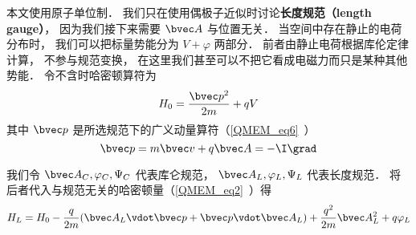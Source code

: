 
\begin{issues}
\issueTODO
\end{issues}


本文使用原子单位制． 我们只在使用偶极子近似时讨论\textbf{长度规范（length gauge）}， 因为我们接下来需要 $\bvec A$ 与位置无关． 当空间中存在静止的电荷分布时， 我们可以把标量势能分为 $V + \varphi$ 两部分． 前者由静止电荷根据库伦定律计算， 不参与规范变换， 在这里我们甚至可以不把它看成电磁力而只是某种其他势能． 令不含时哈密顿算符为
\begin{equation}
H_0 = \frac{\bvec p^2}{2m} + qV
\end{equation}
其中 $\bvec p$ 是所选规范下的广义动量算符（\autoref{QMEM_eq6}~）
\begin{equation}
\bvec p = m \bvec v + q\bvec A = -\I \grad
\end{equation}

我们令 $\bvec A_C, \varphi_C, \Psi_C$ 代表库仑规范， $\bvec A_L, \varphi_L, \Psi_L$ 代表长度规范． 将后者代入与规范无关的哈密顿量（\autoref{QMEM_eq2}~）得
\begin{equation}\label{LenGau_eq2}
H_L = H_0 - \frac{q}{2m} (\bvec A_L \vdot \bvec p + \bvec p \vdot \bvec A_L)
+ \frac{q^2}{2m} \bvec A_L^2 + q \varphi_L
\end{equation}


